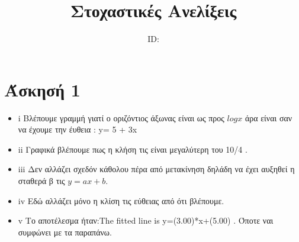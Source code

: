 \documentclass{article}
\title{Στοχαστικές Ανελίξεις\\ \exerciseset}
\author{\studentname \qquad  ID: \suid}
\begin{document}
\maketitle
\section*{Άσκησή 1}
\begin{itemize}
	\item i Βλέπουμε γραμμή γιατί ο οριζόντιος άξωνας είναι ως προς $logx$ άρα είναι σαν να έχουμε την έυθεια : y= 5 + 3x
	\item ii
		Γραφικά βλέπουμε πως η κλήση τις είναι μεγαλύτερη του 10/4 .
	\item iii Δεν αλλάζει σχεδόν κάθολου πέρα από μετακίνηση δηλάδη να έχει αυξηθεί η σταθερά β τις $y=ax+b$.
	\item iv
		Εδώ αλλάζει μόνο η κλίση τις εύθειας από ότι βλέπουμε.
	\item v
		Το αποτέλεσμα ήταν:The fitted line is y=(3.00)*x+(5.00) . Όποτε ναι συμφώνει με τα παραπάνω.

\end{itemize}
\end{document}
